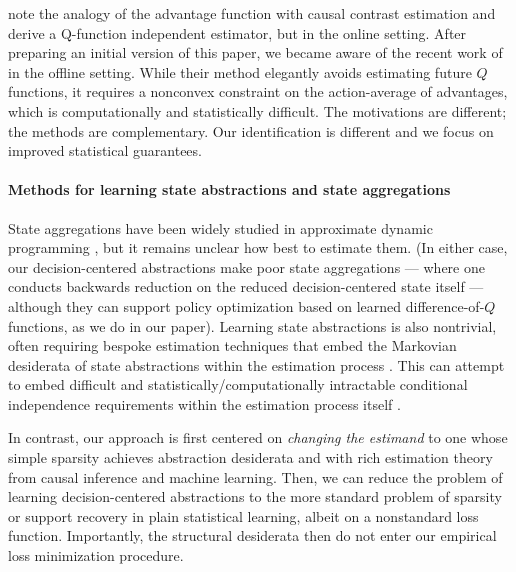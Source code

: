 \documentclass[opre,nonblindrev]{informs4}
\begin{document}
\citet{pan2023learning} note the analogy of the advantage function with causal contrast estimation and derive a Q-function independent estimator, but in the online setting. After preparing an initial version of this paper, we became aware of the recent work of \citet{pan2024skill} in the offline setting. {While their method elegantly avoids estimating future $Q$ functions, it requires a nonconvex constraint on the action-average of advantages, which is computationally and statistically difficult. The motivations are different; the methods are complementary.} Our identification is different and we focus on improved statistical guarantees.

\paragraph{Methods for learning state abstractions and state aggregations}

State aggregations have been widely studied in approximate dynamic programming \citep{van2006performance}, but it remains unclear how best to estimate them. (In either case, our decision-centered abstractions make poor state aggregations --- where one conducts backwards reduction on the reduced decision-centered state itself --- although they can support policy optimization based on learned difference-of-$Q$ functions, as we do in our paper). Learning state abstractions is also nontrivial, often requiring bespoke estimation techniques that embed the Markovian desiderata of state abstractions within the estimation process \citep{bennouna2025learning,kemertas2021towards}. This can attempt to embed difficult and statistically/computationally intractable conditional independence requirements within the estimation process itself \citep{wang2021provably,wang2022causal,wang2022denoised,liu2023}. 

In contrast, our approach is first centered on \textit{changing the estimand} to one whose simple sparsity achieves abstraction desiderata and with rich estimation theory from causal inference and machine learning. Then, we can reduce the problem of learning decision-centered abstractions to the more standard problem of sparsity or support recovery in plain statistical learning, albeit on a nonstandard loss function. Importantly, the structural desiderata then do not enter our empirical loss minimization procedure. 
\end{document}
